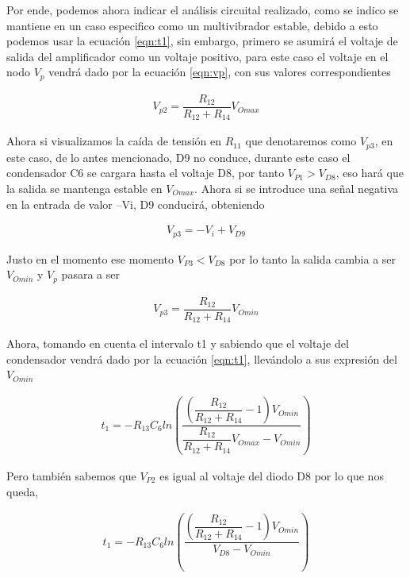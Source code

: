 \begin{enumerate}
                Por ende, podemos ahora indicar el análisis circuital realizado, como se indico se mantiene en un caso especifico como un multivibrador estable, debido a esto podemos usar la ecuación \ref{eqn:t1}, sin embargo, primero se asumirá el voltaje de salida del amplificador como un voltaje positivo, para este caso el voltaje en el nodo $V_p$ vendrá dado por la ecuación \ref{eqn:vp}, con sus valores correspondientes 

                \begin{gather}
                    V_{p2}=\dfrac{R_{12}}{R_{12}+R_{14}}V_{Omax} \label{eqn:vp2}
                \end{gather}

                Ahora si visualizamos la caída de tensión en $R_11$ que denotaremos como $V_{p3}$, en este caso, de lo antes mencionado, D9 no conduce, durante este caso el condensador C6 se cargara hasta el voltaje D8, por tanto $V_{P1}>V_{D8}$, eso hará que la salida se mantenga estable en $V_{Omax}$. Ahora si se introduce una señal negativa en la entrada de valor –Vi, D9 conducirá, obteniendo

                \begin{gather}
                    V_{p3}=-V_i+V_{D9} \label{vp3}
                \end{gather}

                Justo en el momento ese momento $V_{P3}<V_{D8}$ por lo tanto la salida cambia a ser $V_{Omin}$ y $V_p$ pasara a ser
                
                \begin{gather}
                    V_{p3}=\dfrac{R_{12}}{R_{12}+R_{14}}V_{Omin} \label{eqn:vp3}
                \end{gather}

                Ahora, tomando en cuenta el intervalo t1 y sabiendo que el voltaje del condensador vendrá dado por la ecuación \ref{eqn:t1}, llevándolo a sus expresión del $V_{Omin}$

                \begin{gather}
                    t_1=-R_{13}C_6ln\left(\dfrac{\left(\dfrac{R_{12}}{R_{12}+R_{14}}-1\right)V_{Omin}}{\dfrac{R_{12}}{R_{12}+R_{14}}V_{Omax}-V_{Omin}}\right) \label{eqn:t2}
                \end{gather}
                
                Pero también sabemos que $V_{P2}$ es igual al voltaje del diodo D8 por lo que nos queda,

                \begin{gather}
                    t_1=-R_{13}C_6ln\left(\dfrac{\left(\dfrac{R_{12}}{R_{12}+R_{14}}-1\right)V_{Omin}}{V_{D8}-V_{Omin}}\right) \label{eqn:t3}
                \end{gather}


\end{enumerate}
